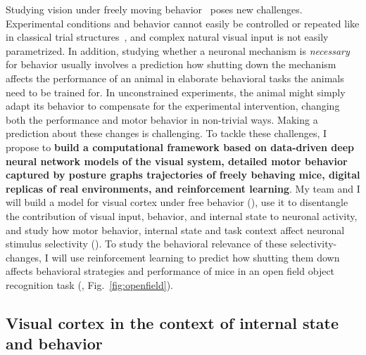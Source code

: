 \documentclass[B2,COG]{ercgrant}
\begin{document}
Studying vision under freely moving behavior~\parencite{Parker2022-ac} poses new challenges. 
Experimental conditions and behavior cannot easily be controlled or repeated like in classical trial structures~\parencite{Huk2018-ez}, and complex natural visual input is not easily parametrized. 
In addition, studying whether a neuronal mechanism is \textit{necessary} for  behavior usually involves a prediction how shutting down the mechanism affects the performance of an animal in elaborate behavioral tasks the animals need to be trained for.
In unconstrained experiments, the animal might simply adapt its behavior to compensate for the experimental intervention, changing both the performance and motor behavior in non-trivial ways.  
Making a prediction about these changes is challenging.
To tackle these challenges, I propose to \textbf{build a computational framework based on data-driven deep neural network models of the visual system, detailed motor behavior captured by posture graphs trajectories of freely behaving mice, digital replicas of real environments, and reinforcement learning}.
My team and I will build a model for visual cortex under free behavior (), use it to disentangle the contribution of visual input, behavior, and internal state to neuronal activity, and study how motor behavior, internal state and task context affect neuronal stimulus selectivity (). To study the behavioral relevance of these selectivity-changes, I will use reinforcement learning to predict how shutting them down affects behavioral strategies and performance of mice in an open field object recognition task  (, Fig.~\ref{fig:openfield}).


\subsection{Visual cortex in the context of internal state and behavior}
\end{document}
